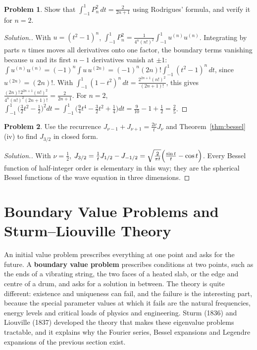 \documentclass[11pt,a4paper]{article}
\numberwithin{equation}{section}
\theoremstyle{definition}
\newtheorem{problemx}{Problem}[subsection]
\newenvironment{problem}{\begin{problemx}}{\end{problemx}}
\newenvironment{solution}
  {\renewcommand{\qedsymbol}{}\begin{proof}[\textit{Solution}.]}
  {\end{proof}}
\begin{document}
\begin{problem}
\label{prob:legnorm}
Show that $\int_{-1}^1P_n^2\,dt = \frac{2}{2n + 1}$ using Rodrigues' formula, and verify it for $n = 2$.
\end{problem}

\begin{solution}
With $u = (t^2 - 1)^n$, $\int_{-1}^1P_n^2 = \frac{1}{4^n(n!)^2}\int_{-1}^1u^{(n)}u^{(n)}$. Integrating by parts $n$ times moves all derivatives onto one factor, the boundary terms vanishing because $u$ and its first
$n - 1$ derivatives vanish at $\pm1$: $\int u^{(n)}u^{(n)} = (-1)^n\int u\,u^{(2n)} = (-1)^n(2n)!\int_{-1}^1(t^2 - 1)^n\,dt$, since $u^{(2n)} = (2n)!$. With $\int_{-1}^1(1 - t^2)^n\,dt = \frac{2^{2n+1}(n!)^2}{(2n + 1)!}$, this gives
$\frac{(2n)!\,2^{2n+1}(n!)^2}{4^n(n!)^2(2n + 1)!} = \frac{2}{2n + 1}$. For $n = 2$, $\int_{-1}^1\bigl(\frac32t^2 - \frac12\bigr)^2dt = \int_{-1}^1\bigl(\frac94t^4 - \frac32t^2 + \frac14\bigr)dt = \frac9{10} - 1 + \frac12 = \frac25$.
\end{solution}

\begin{problem}
Use the recurrence $J_{\nu-1} + J_{\nu+1} = \frac{2\nu}{t}J_\nu$ and Theorem~\ref{thm:bessel}(iv) to find $J_{3/2}$ in closed form.
\end{problem}

\begin{solution}
With $\nu = \frac12$, $J_{3/2} = \frac1tJ_{1/2} - J_{-1/2} = \sqrt{\frac2{\pi t}}\Bigl(\frac{\sin t}{t} - \cos t\Bigr)$. Every Bessel function of half-integer order is elementary in this way; they are the spherical Bessel functions of the
wave equation in three dimensions.
\end{solution}

\section{Boundary Value Problems and Sturm--Liouville Theory}
\label{sec:sturm}

An initial value problem prescribes everything at one point and asks for the future. A \textbf{boundary value problem} prescribes conditions at two points,
such as the ends of a vibrating string, the two faces of a heated slab, or the edge and centre of a drum, and asks for a solution in between. The theory is
quite different: existence and uniqueness can fail, and the failure is the interesting part, because the special parameter values at which it fails are the
natural frequencies, energy levels and critical loads of physics and engineering. Sturm (1836) and Liouville (1837) developed the theory that makes these
eigenvalue problems tractable, and it explains why the Fourier series, Bessel expansions and Legendre expansions of the previous section exist.
\end{document}
